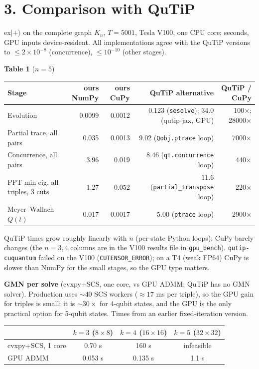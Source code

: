 \documentclass[10pt]{article}
\begin{document}
\section*{3. Comparison with QuTiP}
ex$|{+}\rangle$ on the complete graph $K_n$, $T=5001$, Tesla V100, one CPU core; seconds, GPU inputs device-resident. All implementations agree with the QuTiP versions to $\le2\!\times\!10^{-8}$ (concurrence), $\le10^{-10}$ (other stages).
\begin{center}\small\textbf{Table 1} ($n=5$)\\[2pt]\begin{tabular}{lrrrr}\toprule
Stage & ours NumPy & ours CuPy & QuTiP alternative & QuTiP / CuPy\\\midrule
Evolution & 0.0099 & 0.0012 & 0.123 (\texttt{sesolve}); 34.0 (qutip-jax, GPU) & 100$\times$; 28000$\times$\\
Partial trace, all pairs & 0.035 & 0.0013 & 9.02 (\texttt{Qobj.ptrace} loop) & 7000$\times$\\
Concurrence, all pairs & 3.96 & 0.019 & 8.46 (\texttt{qt.concurrence} loop) & 440$\times$\\
PPT min-eig, all triples, 3 cuts & 1.27 & 0.052 & 11.6 (\texttt{partial\_transpose} loop) & 220$\times$\\
Meyer--Wallach $Q(t)$ & 0.017 & 0.0017 & 5.00 (\texttt{ptrace} loop) & 2900$\times$\\\bottomrule
\end{tabular}\end{center}
QuTiP times grow roughly linearly with $n$ (per-state Python loops); CuPy barely changes (the $n=3,4$ columns are in the V100 results file in \texttt{gpu\_bench}). \texttt{qutip-cuquantum} failed on the V100 (\texttt{CUTENSOR\_ERROR}); on a T4 (weak FP64) CuPy is slower than NumPy for the small stages, so the GPU type matters.

\textbf{GMN per solve} (cvxpy+SCS, one core, vs GPU ADMM; QuTiP has no GMN solver). Production uses $\sim\!40$ SCS workers ($\approx\!17$ ms per triple), so the GPU gain for triples is small; it is $\sim\!30\times$ for 4-qubit states, and the GPU is the only practical option for 5-qubit states. Times from an earlier fixed-iteration version.
\begin{center}\small\begin{tabular}{lccc}\toprule
 & $k=3$ ($8\!\times\!8$) & $k=4$ ($16\!\times\!16$) & $k=5$ ($32\!\times\!32$)\\\midrule
cvxpy+SCS, 1 core & 0.70 s & 160 s & infeasible\\
GPU ADMM & 0.053 s & 0.135 s & 1.1 s\\\bottomrule
\end{tabular}\end{center}
\end{document}
